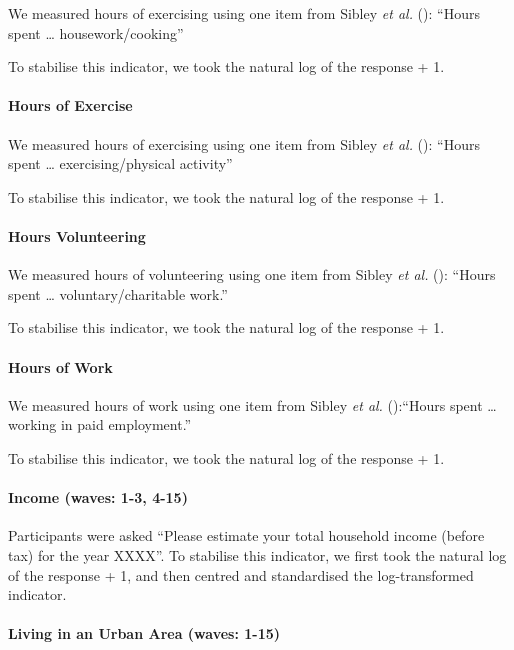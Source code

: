 \documentclass[
  singlecolumn]{article}
\let\oldparagraph\paragraph
\renewcommand{\paragraph}[1]{\oldparagraph{#1}\mbox{}}
\begin{document}
We measured hours of exercising using one item from Sibley \emph{et al.}
(): ``Hours spent \ldots{}
housework/cooking''

To stabilise this indicator, we took the natural log of the response +
1.

\paragraph{Hours of Exercise}\label{hours-of-exercise}

We measured hours of exercising using one item from Sibley \emph{et al.}
(): ``Hours spent \ldots{}
exercising/physical activity''

To stabilise this indicator, we took the natural log of the response +
1.

\paragraph{Hours Volunteering}\label{hours-volunteering}

We measured hours of volunteering using one item from Sibley \emph{et
al.} (): ``Hours spent \ldots{}
voluntary/charitable work.''

To stabilise this indicator, we took the natural log of the response +
1.

\paragraph{Hours of Work}\label{hours-of-work}

We measured hours of work using one item from Sibley \emph{et al.}
():``Hours spent \ldots{} working in paid
employment.''

To stabilise this indicator, we took the natural log of the response +
1.

\paragraph{Income (waves: 1-3, 4-15)}\label{income-waves-1-3-4-15}

Participants were asked ``Please estimate your total household income
(before tax) for the year XXXX''. To stabilise this indicator, we first
took the natural log of the response + 1, and then centred and
standardised the log-transformed indicator.

\paragraph{Living in an Urban Area (waves:
1-15)}\label{living-in-an-urban-area-waves-1-15}
\end{document}
